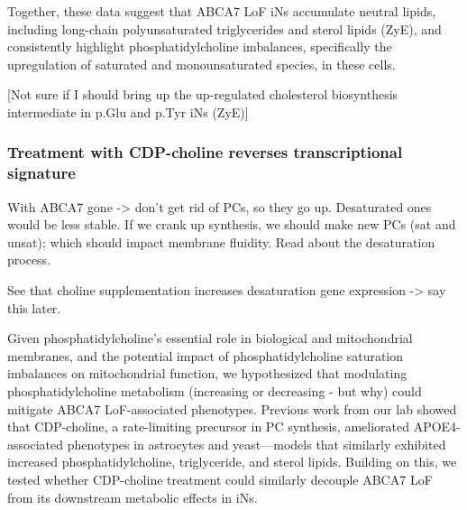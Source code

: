 Together, these data suggest that ABCA7 LoF iNs accumulate neutral lipids, including long-chain polyunsaturated triglycerides and sterol lipids (ZyE), and consistently highlight phosphatidylcholine imbalances, specifically the upregulation of saturated and monounsaturated species, in these cells. 

[Not sure if I should bring up the up-regulated cholesterol biosynthesis intermediate in p.Glu and p.Tyr iNs (ZyE)]


\subsubsection{Treatment with CDP-choline reverses transcriptional signature}

With ABCA7 gone -> don't get rid of PCs, so they go up. Desaturated ones would be less stable.
If we crank up synthesis, we should make new PCs (sat and unsat); which should impact membrane fluidity. Read about the desaturation process.

See that choline supplementation increases desaturation gene expression -> say this later. 

Given phosphatidylcholine's essential role in biological and mitochondrial membranes, and the potential impact of phosphatidylcholine saturation imbalances on mitochondrial function, we hypothesized that modulating phosphatidylcholine metabolism (increasing or decreasing - but why) could mitigate ABCA7 LoF-associated phenotypes. Previous work from our lab showed that CDP-choline, a rate-limiting precursor in PC synthesis, ameliorated APOE4-associated phenotypes in astrocytes and yeast—models that similarly exhibited increased phosphatidylcholine, triglyceride, and sterol lipids. Building on this, we tested whether CDP-choline treatment could similarly decouple ABCA7 LoF from its downstream metabolic effects in iNs.

